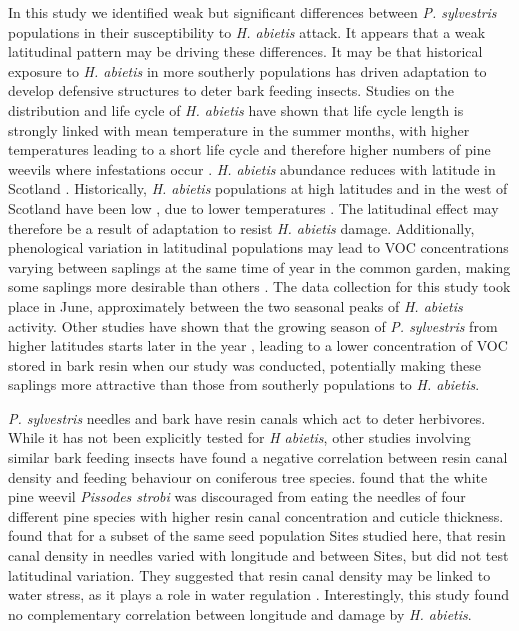 \documentclass[a4paper, 11pt]{article}
\begin{document}
In this study we identified weak but significant differences between \textit{P. sylvestris} populations in their susceptibility to \textit{H. abietis} attack. It appears that a weak latitudinal pattern may be driving these differences. It may be that historical exposure to \textit{H. abietis} in more southerly populations has driven adaptation to develop defensive structures to deter bark feeding insects. Studies on the distribution and life cycle of \textit{H. abietis} have shown that life cycle length is strongly linked with mean temperature in the summer months, with higher temperatures leading to a short life cycle and therefore higher numbers of pine weevils where infestations occur \citep{Leather1999}. \textit{H. abietis} abundance reduces with latitude in Scotland \citep{Barredo2015}. Historically, \textit{H. abietis} populations at high latitudes and in the west of Scotland have been low \citep{Leather1999}, due to lower temperatures \citep{Wainhouse2014}. The latitudinal effect may therefore be a result of adaptation to resist \textit{H. abietis} damage. Additionally, phenological variation in latitudinal populations may lead to VOC concentrations varying between saplings at the same time of year in the common garden, making some saplings more desirable than others \citep{Guenther1997}. The data collection for this study took place in June, approximately between the two seasonal peaks of \textit{H. abietis} activity. Other studies have shown that the growing season of \textit{P. sylvestris} from higher latitudes starts later in the year \citep{Salmela2013}, leading to a lower concentration of VOC stored in bark resin when our study was conducted, potentially making these saplings more attractive than those from southerly populations to \textit{H. abietis}. 

\textit{P. sylvestris} needles and bark have resin canals which act to deter herbivores. While it has not been explicitly tested for \textit{H abietis}, other studies involving similar bark feeding insects have found a negative correlation between resin canal density and feeding behaviour on coniferous tree species. \citet{Boucher2001} found that the white pine weevil \textit{Pissodes strobi} was discouraged from eating the needles of four different pine species with higher resin canal concentration and cuticle thickness. \citet{Donnelly2016} found that for a subset of the same seed population Sites studied here, that resin canal density in needles varied with longitude and between Sites, but did not test latitudinal variation. They suggested that resin canal density may be linked to water stress, as it plays a role in water regulation \citep{Farrell1991}. Interestingly, this study found no complementary correlation between longitude and damage by \textit{H. abietis}.
\end{document}
